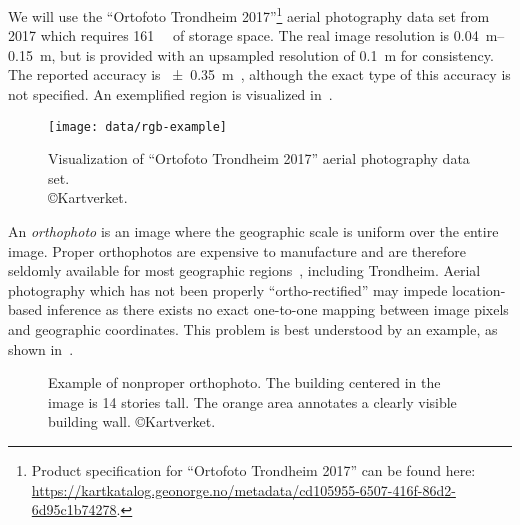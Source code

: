 We will use the \enquote{Ortofoto Trondheim 2017}\footnote{Product specification for \enquote{Ortofoto Trondheim 2017} can be found here:\\ \url{https://kartkatalog.geonorge.no/metadata/cd105955-6507-416f-86d2-6d95c1b74278}.} aerial photography data set from 2017 which requires \SI{161}{\giga\byte} of storage space.
The real image resolution is \SIrange{0.04}{0.15}{\meter}, but is provided with an upsampled resolution of \SI{0.1}{\meter} for consistency.
The reported accuracy is \SI{\pm 0.35}{\meter}~\cite{trondheim_ortophoto_2017}, although the exact type of this accuracy is not specified.
An exemplified region is visualized in~.

\begin{figure}[htb]
  \texttt{[image: data/rgb-example]}
  \caption{%
    Visualization of \enquote{Ortofoto Trondheim 2017} aerial photography data set.\\\copyright{Kartverket}.
  }%
  \label{fig:rgb-example}
\end{figure}

An \textit{orthophoto} is an image where the geographic scale is uniform over the entire image.
Proper orthophotos are expensive to manufacture and are therefore seldomly available for most geographic regions~\cite{ortofoto_in_norway_2003}, including Trondheim.
Aerial photography which has not been properly \enquote{ortho-rectified} may impede location-based inference as there exists no exact one-to-one mapping between image pixels and geographic coordinates.
This problem is best understood by an example, as shown in~.

\begin{figure}[htb]
  \caption{%
    Example of nonproper orthophoto.
    The building centered in the image is 14 stories tall.
    The orange area annotates a clearly visible building wall.
    \copyright{Kartverket}.
  }%
  \label{fig:non-orthophoto-example}
\end{figure}

